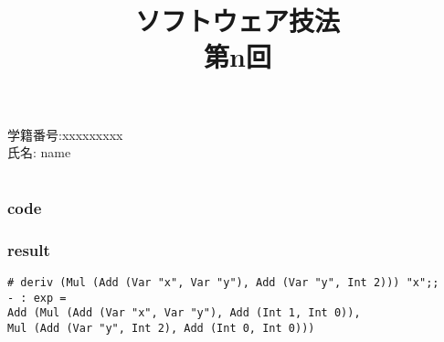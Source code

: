 \documentclass[a4j]{jsarticle}
\title{\rm ソフトウェア技法 \\ 第n回}
\author{}
\date{}
\begin{document}
\maketitle

\begin{description}
	\item[\rm \large 学籍番号:xxxxxxxxx]
	\item[\rm \large 氏名: name]
\end{description}

\section{}
\subsection{}
\subsubsection*{code}

\subsubsection*{result}
\begin{lstlisting}
# deriv (Mul (Add (Var "x", Var "y"), Add (Var "y", Int 2))) "x";;
- : exp =
Add (Mul (Add (Var "x", Var "y"), Add (Int 1, Int 0)),
Mul (Add (Var "y", Int 2), Add (Int 0, Int 0)))
\end{lstlisting}
\end{document}
